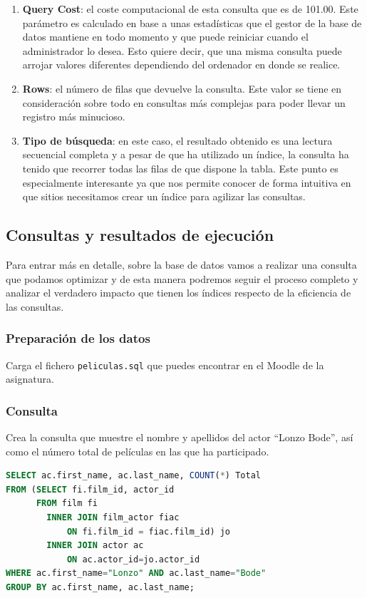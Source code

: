 \documentclass[a4paper]{article}
\begin{document}
\begin{enumerate}
    \item \textbf{Query Cost}: el coste computacional de esta consulta que es de 101.00.  Este parámetro es calculado en base a unas estadísticas que el gestor de la base de datos mantiene en todo momento y que puede reiniciar cuando el administrador lo desea. Esto quiere decir, que una misma consulta puede arrojar valores diferentes dependiendo del ordenador en donde se realice. 
    \item \textbf{Rows}: el número de filas que devuelve la consulta. Este valor se tiene en consideración sobre todo en consultas más complejas para poder llevar un registro más minucioso.
    \item \textbf{Tipo de búsqueda}: en este caso, el resultado obtenido es una lectura secuencial completa y a pesar de que ha utilizado un índice, la consulta ha tenido que recorrer todas las filas de que dispone la tabla. Este punto es especialmente interesante ya que nos permite conocer de forma intuitiva en que sitios necesitamos crear un índice para agilizar las consultas.
\end{enumerate}

\subsection*{Consultas y resultados de ejecución}

Para entrar más en detalle, sobre la base de datos vamos a realizar una consulta que podamos optimizar y de esta manera podremos seguir el proceso completo y analizar el verdadero impacto que tienen los índices respecto de la eficiencia de las consultas.

\subsubsection*{Preparación de los datos}

Carga el fichero \texttt{peliculas.sql} que puedes encontrar en el Moodle de la asignatura.

\subsubsection*{Consulta}

Crea la consulta que muestre el nombre y apellidos del actor ``Lonzo Bode'', así como el número total de películas en las que ha participado.
    
\begin{lstlisting}[language=SQL]
SELECT ac.first_name, ac.last_name, COUNT(*) Total
FROM (SELECT fi.film_id, actor_id 
      FROM film fi 
        INNER JOIN film_actor fiac 
            ON fi.film_id = fiac.film_id) jo 
        INNER JOIN actor ac 
            ON ac.actor_id=jo.actor_id
WHERE ac.first_name="Lonzo" AND ac.last_name="Bode"
GROUP BY ac.first_name, ac.last_name;
\end{lstlisting} 
\end{document}
